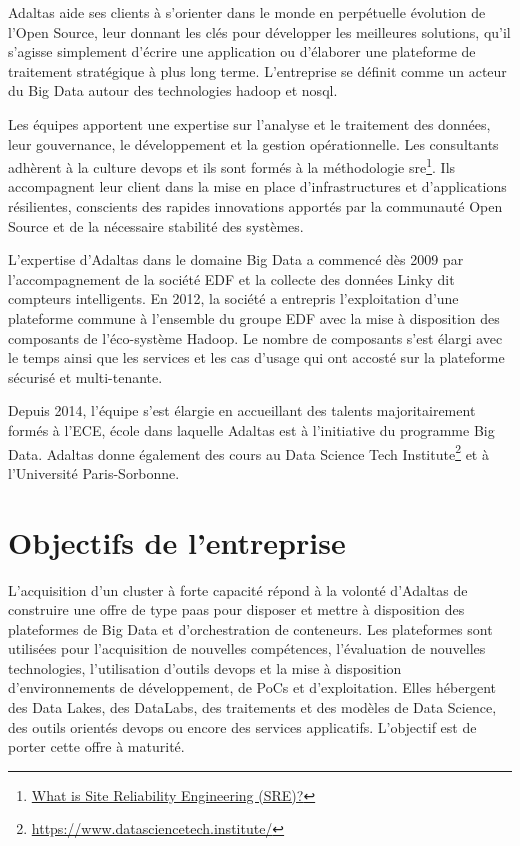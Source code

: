 \documentclass[12pt, french]{report}
\begin{document}
Adaltas aide ses clients à s’orienter dans le monde en perpétuelle évolution de l’Open Source, leur donnant les clés pour développer les meilleures solutions, qu’il s’agisse simplement d’écrire une application ou d’élaborer une plateforme de traitement stratégique à plus long terme. L'entreprise se définit comme un acteur du Big Data autour des technologies \gls{hadoop} et \gls{nosql}.

Les équipes apportent une expertise sur l’analyse et le traitement des données, leur gouvernance, le développement et la gestion opérationnelle. Les consultants adhèrent à la culture \gls{devops} et ils sont formés à la méthodologie \gls{sre}\footnote{\href{https://landing.google.com/sre/}{What is Site Reliability Engineering (SRE)?}}. Ils accompagnent leur client dans la mise en place d’infrastructures et d’applications résilientes, conscients des rapides innovations apportés par la communauté Open Source et de la nécessaire stabilité des systèmes.

L'expertise d'Adaltas dans le domaine Big Data a commencé dès 2009 par l'accompagnement de la société EDF et la collecte des données Linky dit compteurs intelligents. En 2012, la société a entrepris l’exploitation d'une plateforme commune à l'ensemble du groupe EDF avec la mise à disposition des composants de l’éco-système Hadoop. Le nombre de composants s'est élargi avec le temps ainsi que les services et les cas d’usage qui ont accosté sur la plateforme sécurisé et multi-tenante.

Depuis 2014, l’équipe s’est élargie en accueillant des talents majoritairement formés à l’ECE, école dans laquelle Adaltas est à l’initiative du programme Big Data. Adaltas donne également des cours au Data Science Tech Institute\footnote{\href{https://www.datasciencetech.institute/}{https://www.datasciencetech.institute/}} et à l’Université Paris-Sorbonne.

\section{Objectifs de l'entreprise}

L’acquisition d’un cluster à forte capacité répond à la volonté d’Adaltas de construire une offre de type \gls{paas} pour disposer et mettre à disposition des plateformes de Big Data et d’orchestration de conteneurs. Les plateformes sont utilisées pour l’acquisition de nouvelles compétences, l’évaluation de nouvelles technologies, l’utilisation d’outils \gls{devops} et la mise à disposition d’environnements de développement, de PoCs et d’exploitation. Elles hébergent des Data Lakes, des DataLabs, des traitements et des modèles de Data Science, des outils orientés \gls{devops} ou encore des services applicatifs. L’objectif est de porter cette offre à maturité.
\end{document}
